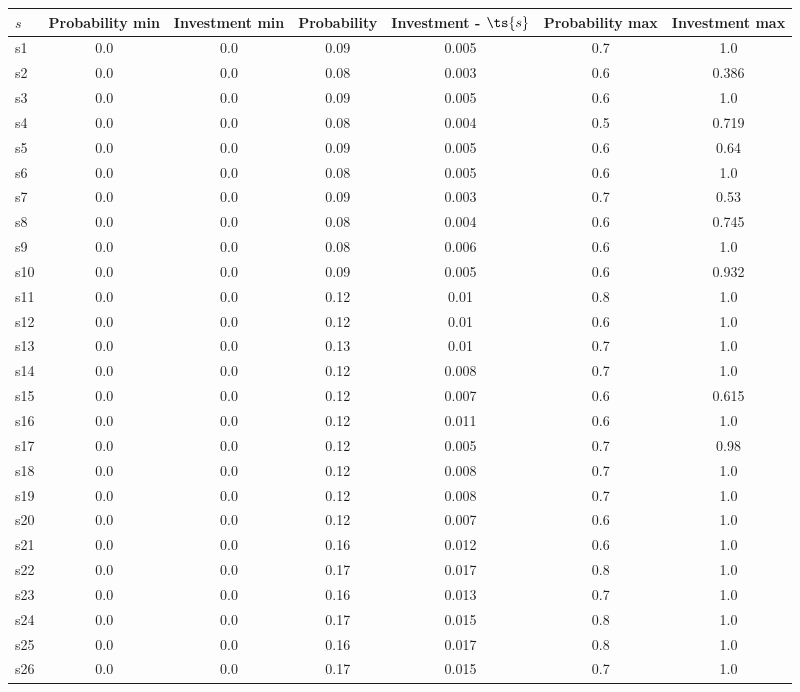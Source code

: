 \documentclass{article}
\begin{document}
\noindent\begin{tabular}{|l|c|c|c|c|c|c|}
\hline
$s$& Probability min & Investment min & Probability & Investment - $\ts{s}$ & Probability max & Investment max\\
\hline
s1 &0.0 & 0.0 & 0.09 & 0.005 & 0.7 & 1.0\\
\hline
s2 &0.0 & 0.0 & 0.08 & 0.003 & 0.6 & 0.386\\
\hline
s3 &0.0 & 0.0 & 0.09 & 0.005 & 0.6 & 1.0\\
\hline
s4 &0.0 & 0.0 & 0.08 & 0.004 & 0.5 & 0.719\\
\hline
s5 &0.0 & 0.0 & 0.09 & 0.005 & 0.6 & 0.64\\
\hline
s6 &0.0 & 0.0 & 0.08 & 0.005 & 0.6 & 1.0\\
\hline
s7 &0.0 & 0.0 & 0.09 & 0.003 & 0.7 & 0.53\\
\hline
s8 &0.0 & 0.0 & 0.08 & 0.004 & 0.6 & 0.745\\
\hline
s9 &0.0 & 0.0 & 0.08 & 0.006 & 0.6 & 1.0\\
\hline
s10 &0.0 & 0.0 & 0.09 & 0.005 & 0.6 & 0.932\\
\hline
s11 &0.0 & 0.0 & 0.12 & 0.01 & 0.8 & 1.0\\
\hline
s12 &0.0 & 0.0 & 0.12 & 0.01 & 0.6 & 1.0\\
\hline
s13 &0.0 & 0.0 & 0.13 & 0.01 & 0.7 & 1.0\\
\hline
s14 &0.0 & 0.0 & 0.12 & 0.008 & 0.7 & 1.0\\
\hline
s15 &0.0 & 0.0 & 0.12 & 0.007 & 0.6 & 0.615\\
\hline
s16 &0.0 & 0.0 & 0.12 & 0.011 & 0.6 & 1.0\\
\hline
s17 &0.0 & 0.0 & 0.12 & 0.005 & 0.7 & 0.98\\
\hline
s18 &0.0 & 0.0 & 0.12 & 0.008 & 0.7 & 1.0\\
\hline
s19 &0.0 & 0.0 & 0.12 & 0.008 & 0.7 & 1.0\\
\hline
s20 &0.0 & 0.0 & 0.12 & 0.007 & 0.6 & 1.0\\
\hline
s21 &0.0 & 0.0 & 0.16 & 0.012 & 0.6 & 1.0\\
\hline
s22 &0.0 & 0.0 & 0.17 & 0.017 & 0.8 & 1.0\\
\hline
s23 &0.0 & 0.0 & 0.16 & 0.013 & 0.7 & 1.0\\
\hline
s24 &0.0 & 0.0 & 0.17 & 0.015 & 0.8 & 1.0\\
\hline
s25 &0.0 & 0.0 & 0.16 & 0.017 & 0.8 & 1.0\\
\hline
s26 &0.0 & 0.0 & 0.17 & 0.015 & 0.7 & 1.0\\

\end{tabular}
\end{document}
